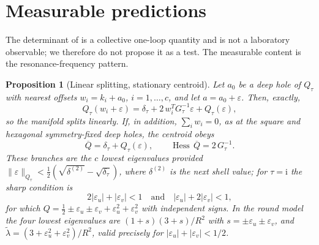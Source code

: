 \documentclass[11pt,a4paper]{article}
\newtheorem{proposition}{Proposition}[section]
\newcommand{\eps}{\varepsilon}
\newcommand{\ii}{\mathrm{i}}
\begin{document}
\section{Measurable predictions}
\label{sec:predictions}

The determinant of  is a collective one-loop quantity and is not a laboratory observable; we therefore do not propose it as a test. The measurable content is the resonance-frequency pattern.

\begin{proposition}[Linear splitting, stationary centroid]
\label{prop:splitting}
Let $a_0$ be a deep hole of $Q_\tau$ with nearest offsets $w_i=k_i+a_0$, $i=1,\ldots,c$, and let $a=a_0+\eps$. Then, exactly,
\begin{equation}
Q_\tau(w_i+\eps)=\delta_\tau+2\,w_i^TG_\tau^{-1}\eps+Q_\tau(\eps),
\label{eq:splitting}
\end{equation}
so the manifold splits linearly. If, in addition, $\sum_i w_i=0$, as at the square and hexagonal symmetry-fixed deep holes, the centroid obeys
\begin{equation}
\overline Q=\delta_\tau+Q_\tau(\eps),\qquad \operatorname{Hess}\,\overline Q=2\,G_\tau^{-1}.
\label{eq:centroid}
\end{equation}
These branches are the $c$ lowest eigenvalues provided $\|\eps\|_{Q_\tau}<\tfrac12(\sqrt{\delta^{(2)}}-\sqrt{\delta_\tau})$, where $\delta^{(2)}$ is the next shell value; for $\tau=\ii$ the sharp condition is
\begin{equation}
2|\eps_u|+|\eps_v|<1\quad\text{and}\quad |\eps_u|+2|\eps_v|<1,
\label{eq:sharp}
\end{equation}
for which $Q=\tfrac12\pm\eps_u\pm\eps_v+\eps_u^2+\eps_v^2$ with independent signs. In the round model the four lowest eigenvalues are $(1+s)(3+s)/R^2$ with $s=\pm\eps_u\pm\eps_v$, and $\tilde\lambda=(3+\eps_u^2+\eps_v^2)/R^2$, valid precisely for $|\eps_u|+|\eps_v|<1/2$.
\end{proposition}
\end{document}

